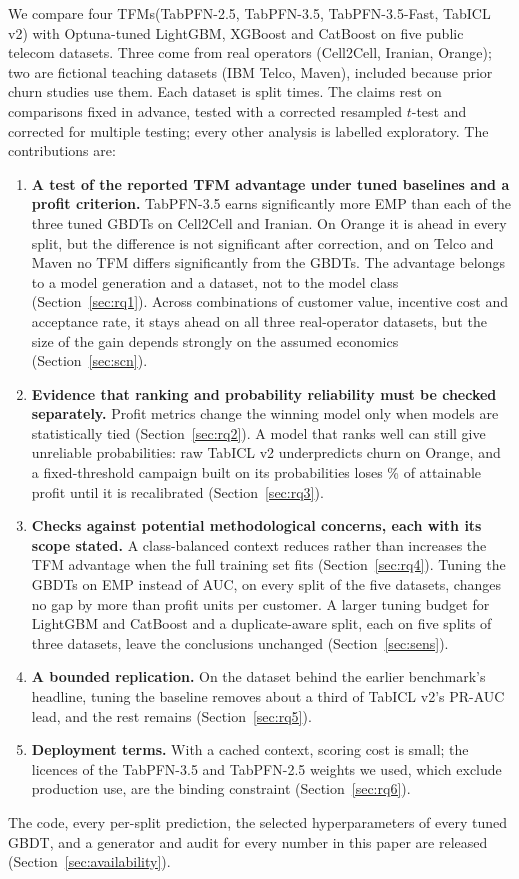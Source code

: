 \documentclass[11pt]{article}
\newcommand{\tfm}{TFM\xspace}
\newcommand{\tfms}{TFMs\xspace}
\begin{document}
We compare four \tfms (TabPFN-2.5, TabPFN-3.5, TabPFN-3.5-Fast, TabICL v2) with Optuna-tuned LightGBM, XGBoost and
CatBoost on five public telecom datasets. Three come from real operators (Cell2Cell, Iranian, Orange); two are
fictional teaching datasets (IBM Telco, Maven), included because prior churn studies use them. Each dataset is split
\nSeeds{} times. The claims rest on \nPrimary{} comparisons fixed in advance, tested with a corrected resampled $t$-test and
corrected for multiple testing; every other analysis is labelled exploratory. The contributions are:
\begin{enumerate}
\item \textbf{A test of the reported \tfm advantage under tuned baselines and a profit criterion.} TabPFN-3.5 earns
  significantly more EMP than each of the three tuned GBDTs on Cell2Cell and Iranian. On Orange it is ahead in every
  split, but the difference is not significant after correction, and on Telco and Maven no \tfm differs significantly
  from the GBDTs. The advantage belongs to a model generation and a dataset, not to the model class
  (Section~\ref{sec:rq1}). Across \nScenarios{}
  combinations of customer value, incentive cost and acceptance rate, it stays ahead on all three real-operator
  datasets, but the size of the gain depends strongly on the assumed economics (Section~\ref{sec:scn}).
\item \textbf{Evidence that ranking and probability reliability must be checked separately.} Profit metrics change
  the winning model only when models are statistically tied (Section~\ref{sec:rq2}). A model that ranks well can
  still give unreliable probabilities: raw TabICL v2 underpredicts churn on Orange, and a fixed-threshold campaign
  built on its probabilities loses \regICLOrangeRaw\% of attainable profit until it is recalibrated
  (Section~\ref{sec:rq3}).
\item \textbf{Checks against potential methodological concerns, each with its scope stated.} A class-balanced context
  reduces rather than increases the \tfm advantage when the full training set fits (Section~\ref{sec:rq4}). Tuning
  the GBDTs on EMP instead of AUC, on every split of the five datasets, changes no gap by more than \maxEmpTuneShift{}
  profit units per customer. A larger tuning budget for LightGBM and CatBoost and a duplicate-aware split, each on five
  splits of three datasets, leave the conclusions unchanged (Section~\ref{sec:sens}).
\item \textbf{A bounded replication.} On the dataset behind the earlier benchmark's headline, tuning the baseline
  removes about a third of TabICL v2's PR-AUC lead, and the rest remains (Section~\ref{sec:rq5}).
\item \textbf{Deployment terms.} With a cached context, scoring cost is small; the licences of the TabPFN-3.5 and
  TabPFN-2.5 weights we used, which exclude production use, are the binding constraint (Section~\ref{sec:rq6}).
\end{enumerate}
The code, every per-split prediction, the selected hyperparameters of every tuned GBDT, and a generator and audit for
every number in this paper are released (Section~\ref{sec:availability}).
\end{document}

